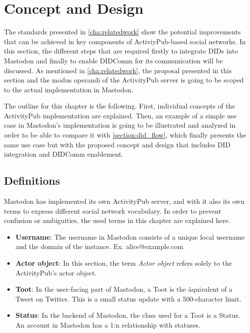 \chapter{Concept and Design}
\label{cha:conceptanddesign}
 
The standards presented in \autoref{cha:relatedwork} show the potential improvements that can be achieved in key components of ActiviyPub-based social networks. In this section, the different steps that are required firstly to integrate DIDs into Mastodon and finally to enable DIDComm for its communication will be discussed. As mentioned in \autoref{cha:relatedwork}, the proposal presented in this section and the modus operandi of the ActivityPub server is going to be scoped to the actual implementation in Mastodon.

The outline for this chapter is the following. First, individual concepts of the ActivityPub implementation are explained. Then, an example of a simple use case in Mastodon's implementation is going to be illustrated and analyzed in order to be able to compare it with \autoref{section:did_flow}, which finally presents the same use case but with the proposed concept and design that includes DID integration and DIDComm enablement.
 
\section{Definitions}
Mastodon has implemented its own ActivityPub server, and with it also its own terms to express different social network vocabulary. In order to prevent confusion or ambiguities, the used terms in this chapter are explained here. 
 
\begin{itemize}
  \item \textbf{Username}: The username in Mastodon consists of a unique local username and the domain of the instance. Ex. alice@example.com
  \item \textbf{Actor object}: In this section, the term \emph{Actor object} refers solely to the ActivityPub's actor object. 
  \item \textbf{Toot}: In the user-facing part of Mastodon, a Toot is the äquivalent of a Tweet on Twitter. This is a small status update with a 500-character limit.
  \item \textbf{Status}: In the backend of Mastodon, the class used for a Toot is a Status. An account in Mastodon has a 1:n relationship with statuses.
\end{itemize}


